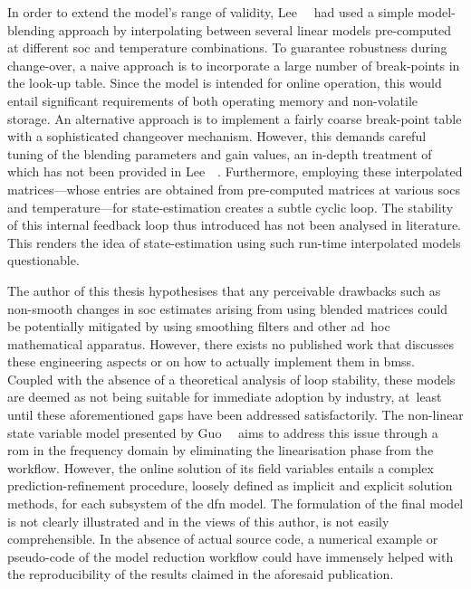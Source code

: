 In order to extend the model's range of validity, Lee~\etal{}~\cite{Lee2014} had
used a  simple model-blending approach  by interpolating between  several linear
models  pre-computed at  different  \gls{soc} and  temperature combinations.  To
guarantee robustness  during change-over, a  naive approach is to  incorporate a
large  number  of  break-points  in  the  look-up  table.  Since  the  model  is
intended  for  online  operation,  this would  entail  significant  requirements
of  both operating  memory  and non-volatile  storage.  An alternative  approach
is  to  implement  a  fairly  coarse  break-point  table  with  a  sophisticated
changeover  mechanism. However,  this  demands careful  tuning  of the  blending
parameters  and  gain values,  an  in-depth  treatment  of  which has  not  been
provided in Lee~\etal~\cite{Lee2014}.  Furthermore, employing these interpolated
matrices---whose  entries are  obtained  from pre-computed  matrices at  various
\glspl{soc} and temperature---for state-estimation creates a subtle cyclic loop.
The  stability of  this  internal feedback  loop thus  introduced  has not  been
analysed in  literature. This  renders the idea  of state-estimation  using such
run-time interpolated models questionable.


The author  of this thesis hypothesises  that any perceivable drawbacks  such as
non-smooth changes  in \gls{soc} estimates  arising from using  blended matrices
could  be potentially  mitigated by  using  smoothing filters  and other
\mbox{ad hoc} mathematical apparatus. However,  there exists no published  work
that discusses these engineering aspects  or on how to actually implement  them
in \glspl{bms}. Coupled with  the absence  of a  theoretical analysis  of loop
stability, these models are deemed  as not being suitable for immediate
adoption by industry, at~least until  these aforementioned gaps  have been
addressed  satisfactorily. The non-linear state variable model  presented by
Guo~\etal{}~\cite{Guo2017} aims to address this  issue through a \gls{rom}  in
the frequency domain  by eliminating the linearisation phase  from the workflow.
However, the online  solution of its field  variables  entails  a complex
prediction-refinement  procedure,  loosely defined as  implicit and explicit
solution methods,  for each subsystem  of the \gls{dfn} model. The  formulation
of the final model is  not clearly illustrated and in the views of this author,
is not easily comprehensible. In the absence of actual source  code, a numerical
example  or pseudo-code of the  model reduction workflow could  have immensely
helped with the  reproducibility of  the results claimed in the aforesaid
publication.

